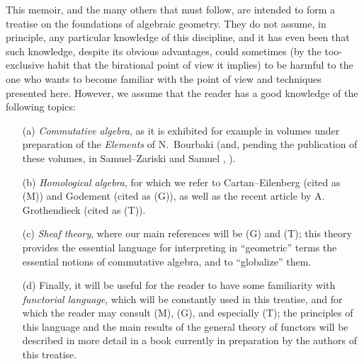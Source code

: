 This memoir, and the many others that must follow, are intended to form a
treatise on the foundations of algebraic geometry. They do not assume, in
principle, any particular knowledge of this discipline, and it has even been
that such knowledge, despite its obvious advantages, could sometimes (by the
too-exclusive habit that the birational point of view it implies) to be harmful
to the one who wants to become familiar with the point of view and techniques
presented here. However, we assume that the reader has a good knowledge of the
following topics:
\begin{itemize}
  \item[(a)] \emph{Commutative algebra}, as it is exhibited for example in
            volumes under preparation of the \emph{Elements} of N.~Bourbaki
            (and, pending the publication of these volumes, in Samuel--Zariski
            \cite{I-13} and Samuel \cite{I-11}, \cite{I-12}).
  \item[(b)] \emph{Homological algebra}, for which we refer to Cartan--Eilenberg
             \cite{I-2} (cited as (M)) and Godement \cite{I-4} (cited as (G)), as well
             as the recent article by A. Grothendieck \cite{I-6} (cited as (T)).
  \item[(c)] \emph{Sheaf theory}, where our main references will be (G) and (T);
             this theory provides the essential language for interpreting in
             ``geometric'' terms the essential notions of commutative algebra,
             and to ``globalize'' them.
  \item[(d)] Finally, it will be useful for the reader to have some familiarity with
             \emph{functorial language}, which will be constantly used in this
             treatise, and for which the reader may consult (M), (G), and especially
             (T); the principles of this language and the main results of the general
             theory of functors will be described in more detail in a book currently
             in preparation by the authors of this treatise.
\end{itemize}

\sectionbreak

